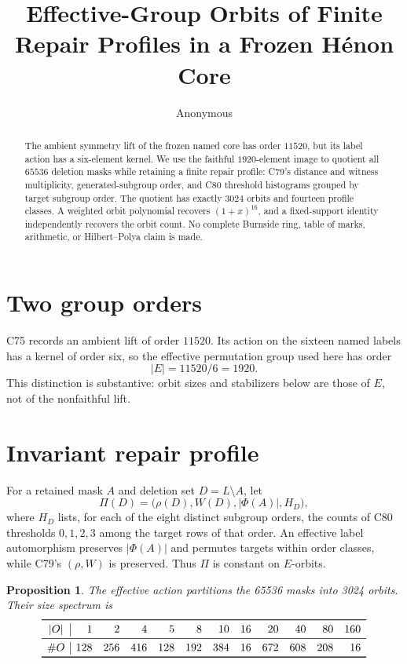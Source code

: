 \documentclass[10pt]{article}
\title{Effective-Group Orbits of Finite Repair Profiles in a Frozen H\'enon Core}
\author{Anonymous}
\date{}
\newtheorem{proposition}{Proposition}
\newcommand{\Phiop}{\Phi}
\begin{document}
\maketitle

\begin{abstract}
The ambient symmetry lift of the frozen named core has order $11520$, but its
label action has a six-element kernel.  We use the faithful $1920$-element
image to quotient all $65536$ deletion masks while retaining a finite repair
profile: C79's distance and witness multiplicity, generated-subgroup order,
and C80 threshold histograms grouped by target subgroup order.  The quotient
has exactly $3024$ orbits and fourteen profile classes.  A weighted orbit
polynomial recovers $(1+x)^{16}$, and a fixed-support identity independently
recovers the orbit count.  No complete Burnside ring, table of marks,
arithmetic, or Hilbert--Polya claim is made.
\end{abstract}

\section{Two group orders}
C75 records an ambient lift of order $11520$.  Its action on the sixteen named
labels has a kernel of order six, so the effective permutation group used here
has order
\[
 |E|=11520/6=1920.
\]
This distinction is substantive: orbit sizes and stabilizers below are those
of $E$, not of the nonfaithful lift.

\section{Invariant repair profile}
For a retained mask $A$ and deletion set $D=L\setminus A$, let
\[
 \Pi(D)=\bigl(\rho(D),W(D),|\Phiop(A)|,H_D\bigr),
\]
where $H_D$ lists, for each of the eight distinct subgroup orders, the counts
of C80 thresholds $0,1,2,3$ among the target rows of that order.  An effective
label automorphism preserves $|\Phiop(A)|$ and permutes targets within order
classes, while C79's $(\rho,W)$ is preserved.  Thus $\Pi$ is constant on
$E$-orbits.

\begin{proposition}
The effective action partitions the 65536 masks into 3024 orbits.  Their size
spectrum is
\[
\begin{array}{c|rrrrrrrrrrr}
\toprule
|O|&1&2&4&5&8&10&16&20&40&80&160\\
\midrule
\#O&128&256&416&128&192&384&16&672&608&208&16\\
\bottomrule
\end{array}
\]
\end{proposition}
\end{document}
